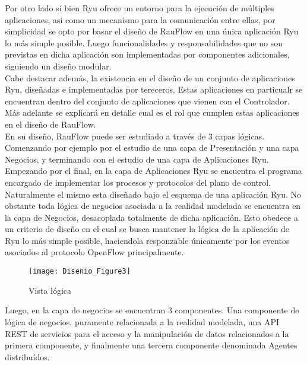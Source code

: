 Por otro lado si bien Ryu ofrece un entorno para la ejecuci\'on de m\'ultiples aplicaciones, asi como un mecanismo para la comunicaci\'on entre ellas, por simplicidad se opto por basar el dise\~no de RauFlow en una \'unica aplicaci\'on Ryu lo m\'as simple posible. Luego funcionalidades y responsabilidades que no son previstas en dicha aplicaci\'on son implementadas por componentes adicionales, siguiendo un dise\~no modular.\\

Cabe destacar adem\'as, la existencia en el dise\~no de un conjunto de aplicaciones Ryu, dise\~nadas e implementadas por tereceros. Estas aplicaciones en particualr se encuentran dentro del conjunto de aplicaciones que vienen con el Controlador. M\'as adelante se explicar\'a en detalle cual es el rol que cumplen estas aplicaciones en el dise\~no de RauFlow.\\

En su dise\~no, RauFlow puede ser estudiado a trav\'es de 3 capas l\'ogicas. Comenzando por ejemplo por el estudio de una capa de Presentaci\'on y una capa Negocios, y terminando con el estudio de una capa de Aplicaciones Ryu.\\ 


Empezando por el final, en la capa de Aplicaciones Ryu se encuentra el programa encargado de implementar los procesos y protocolos del plano de control. Naturalmente el mismo esta dise\~nado bajo el esquema de una aplicaci\'on Ryu. No obstante toda l\'ogica de negocios asociada a la realidad modelada se encuentra en la capa de Negocios, desacoplada totalmente de dicha aplicaci\'on. Esto obedece a un criterio de dise\~no en el cual se busca mantener la l\'ogica de la aplicaci\'on de Ryu lo m\'as simple posible, haciendola responzable \'unicamente por los eventos asociados al protocolo OpenFlow principalmente.\\ 

\begin{figure}[ht!] 
\centering    
\texttt{[image: Disenio\_Figure3]}
\caption[Vista l\'ogica]{Vista l\'ogica}
\label{fig:VistaComponentes2}
\end{figure}

Luego, en la capa de negocios se encuentran 3 componentes. Una componente de l\'ogica de negocios, puramente relacionada a la realidad modelada, una API REST de servicios para el acceso y la manipulaci\'on de datos relacionados a la primera componente, y finalmente una tercera componente denominada Agentes distribu\'idos.\\

